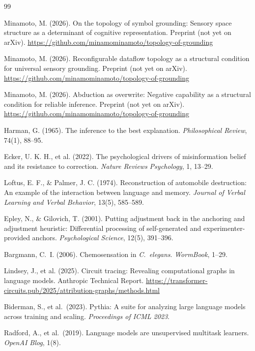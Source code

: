 \documentclass[12pt]{article}
\begin{document}
\begin{thebibliography}{99}

Minamoto, M. (2026).
On the topology of symbol grounding: Sensory space structure as a
determinant of cognitive representation.
Preprint (not yet on arXiv).
\url{https://github.com/minamominamoto/topology-of-grounding}

Minamoto, M. (2026).
Reconfigurable dataflow topology as a structural condition for
universal sensory grounding.
Preprint (not yet on arXiv).
\url{https://github.com/minamominamoto/topology-of-grounding}

Minamoto, M. (2026).
Abduction as overwrite: Negative capability as a structural
condition for reliable inference.
Preprint (not yet on arXiv).
\url{https://github.com/minamominamoto/topology-of-grounding}

Harman, G. (1965).
The inference to the best explanation.
\textit{Philosophical Review}, 74(1), 88--95.

Ecker, U. K. H., et al. (2022).
The psychological drivers of misinformation belief and its resistance
to correction.
\textit{Nature Reviews Psychology}, 1, 13--29.

Loftus, E. F., \& Palmer, J. C. (1974).
Reconstruction of automobile destruction: An example of the
interaction between language and memory.
\textit{Journal of Verbal Learning and Verbal Behavior}, 13(5),
585--589.

Epley, N., \& Gilovich, T. (2001).
Putting adjustment back in the anchoring and adjustment heuristic:
Differential processing of self-generated and experimenter-provided
anchors.
\textit{Psychological Science}, 12(5), 391--396.

Bargmann, C.~I. (2006).
Chemosensation in \textit{C.~elegans}.
\textit{WormBook}, 1--29.

Lindsey, J., et al. (2025).
Circuit tracing: Revealing computational graphs in language models.
Anthropic Technical Report.
\url{https://transformer-circuits.pub/2025/attribution-graphs/methods.html}

Biderman, S., et al.\ (2023).
Pythia: A suite for analyzing large language models across training and scaling.
\textit{Proceedings of ICML 2023}.

Radford, A., et al.\ (2019).
Language models are unsupervised multitask learners.
\textit{OpenAI Blog}, 1(8).

\end{thebibliography}
\end{document}
